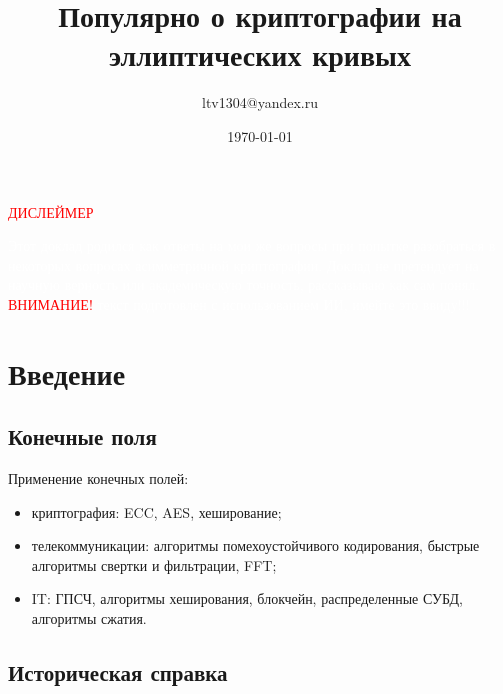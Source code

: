 \documentclass[aspectratio=169]{beamer}
\title[ECC]{Популярно о криптографии на \\[0.5em] эллиптических кривых}
\author[RNDSOFT]{ltv1304@yandex.ru}
\institute[]{RNDSOFT}
\date[]{\today}
\begin{document}
  
  \begin{frame}[plain]
    \centering
    \hspace*{-2cm}
    \begin{minipage}{\dimexpr\textwidth+2cm\relax}
      \centering
      \titlepage
    \end{minipage}
  \end{frame}

  \begin{frame}[plain]
    \centering
    \hspace*{-2cm}
    \begin{minipage}{\dimexpr\textwidth+2cm\relax}
      \centering
      {\textcolor{red}{\uppercase{дислеймер}}\par}
      
      \bigskip
      \textcolor{white}{
        Этот доклад родился как ответы на мои же вопросы при попытке разобраться в некоторых вопросах асимметричной криптографии. 
        Доклад не претендует на научную верность или академическую точность, рассказываю как сам понял. 
        \textcolor{red}{\uppercase{внимание!}} текст подготовлен с использованием ИИ, имейте это ввиду!!!
      }
    \end{minipage}
  \end{frame}


  \section{Введение}
    
    \subsection{Конечные поля}
      \begin{frame}
        Применение конечных полей:
        \begin{itemize}[label=---]  
          \item криптография: ECC, AES, хеширование;
          \item телекоммуникации: алгоритмы помехоустойчивого кодирования, быстрые алгоритмы свертки и фильтрации, FFT;
          \item IT: ГПСЧ, алгоритмы хеширования, блокчейн, распределенные СУБД, алгоритмы сжатия.
        \end{itemize}
      \end{frame}
    \subsection{Историческая справка}
\end{document}
